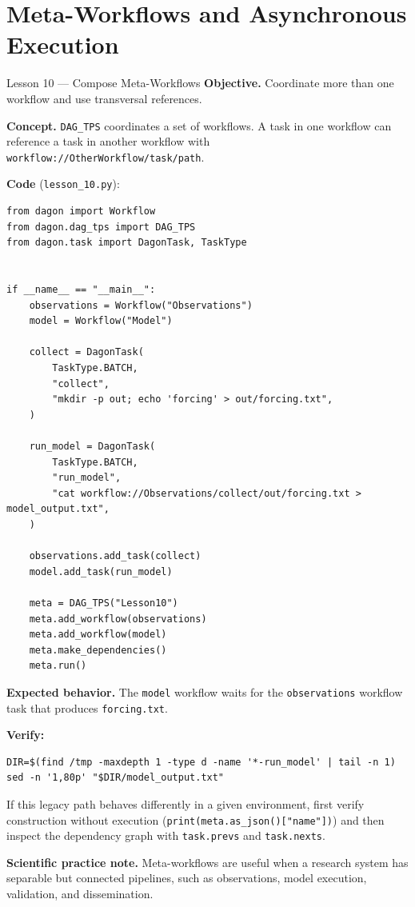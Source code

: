 \chapter{Meta-Workflows and Asynchronous Execution}
\label{ch:meta-async}

\begin{lessonbox}{Lesson 10 --- Compose Meta-Workflows}
\textbf{Objective.} Coordinate more than one workflow and use transversal
references.

\textbf{Concept.} \texttt{DAG\_TPS} coordinates a set of workflows. A task in
one workflow can reference a task in another workflow with
\texttt{workflow://OtherWorkflow/task/path}.

\textbf{Code} (\texttt{lesson\_10.py}):
\begin{lstlisting}
from dagon import Workflow
from dagon.dag_tps import DAG_TPS
from dagon.task import DagonTask, TaskType


if __name__ == "__main__":
    observations = Workflow("Observations")
    model = Workflow("Model")

    collect = DagonTask(
        TaskType.BATCH,
        "collect",
        "mkdir -p out; echo 'forcing' > out/forcing.txt",
    )

    run_model = DagonTask(
        TaskType.BATCH,
        "run_model",
        "cat workflow://Observations/collect/out/forcing.txt > model_output.txt",
    )

    observations.add_task(collect)
    model.add_task(run_model)

    meta = DAG_TPS("Lesson10")
    meta.add_workflow(observations)
    meta.add_workflow(model)
    meta.make_dependencies()
    meta.run()
\end{lstlisting}

\textbf{Expected behavior.} The \texttt{model} workflow waits for the
\texttt{observations} workflow task that produces \texttt{forcing.txt}.

\textbf{Verify:}
\begin{lstlisting}[style=bash]
DIR=$(find /tmp -maxdepth 1 -type d -name '*-run_model' | tail -n 1)
sed -n '1,80p' "$DIR/model_output.txt"
\end{lstlisting}

If this legacy path behaves differently in a given environment, first verify
construction without execution (\texttt{print(meta.as\_json()["name"])}) and
then inspect the dependency graph with \texttt{task.prevs} and
\texttt{task.nexts}.

\textbf{Scientific practice note.} Meta-workflows are useful when a research
system has separable but connected pipelines, such as observations, model
execution, validation, and dissemination.
\end{lessonbox}

